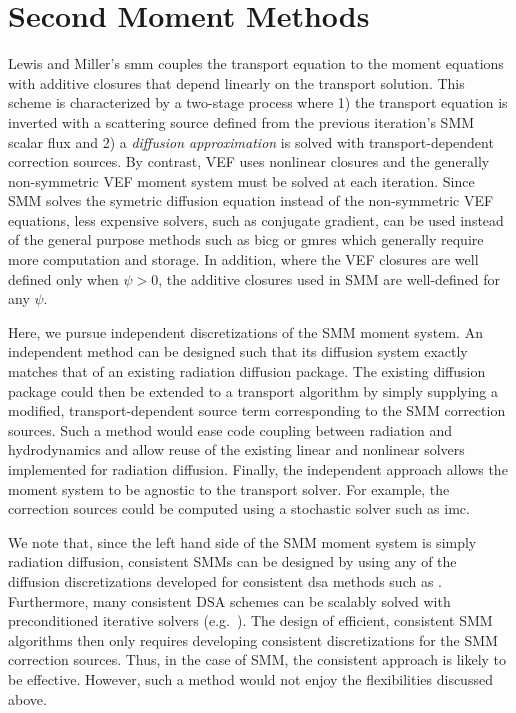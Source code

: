 \documentclass[../doc.tex]{subfiles}
\begin{document}
\chapter{Second Moment Methods} \label{chap:smm}
Lewis and Miller's \gls{smm} \cite{lewis_miller} couples the transport equation to the moment equations with additive closures that depend linearly on the transport solution. This scheme is characterized by a two-stage process where 1) the transport equation is inverted with a scattering source defined from the previous iteration's SMM scalar flux and 2) a \emph{diffusion approximation} is solved with transport-dependent correction sources. By contrast, VEF uses nonlinear closures and the generally non-symmetric VEF moment system must be solved at each iteration. Since SMM solves the symetric diffusion equation instead of the non-symmetric VEF equations, less expensive solvers, such as conjugate gradient, can be used instead of the general purpose methods such as \gls{bicg} or \gls{gmres} which generally require more computation and storage. 
In addition, where the VEF closures are well defined only when $\psi>0$, the additive closures used in SMM are well-defined for any $\psi$. 

Here, we pursue independent discretizations of the SMM moment system. 
An independent method can be designed such that its diffusion system exactly matches that of an existing radiation diffusion package. The existing diffusion package could then be extended to a transport algorithm by simply supplying a modified, transport-dependent source term corresponding to the SMM correction sources. Such a method would ease code coupling between radiation and hydrodynamics and allow reuse of the existing linear and nonlinear solvers implemented for radiation diffusion. Finally, the independent approach allows the moment system to be agnostic to the transport solver. For example, the correction sources could be computed using a stochastic solver such as \gls{imc}. 

We note that, since the left hand side of the SMM moment system is simply radiation diffusion, consistent SMMs can be designed by using any of the diffusion discretizations developed for consistent \gls{dsa} methods such as \textcite{WWM,AM,WR,ldrd_dsa}. Furthermore, many consistent DSA schemes can be scalably solved with preconditioned iterative solvers (e.g.~\cite{ldrd_dsa,WR}). The design of efficient, consistent SMM algorithms then only requires developing consistent discretizations for the SMM correction sources. Thus, in the case of SMM, the consistent approach is likely to be effective. However, such a method would not enjoy the flexibilities discussed above. 
\end{document}
